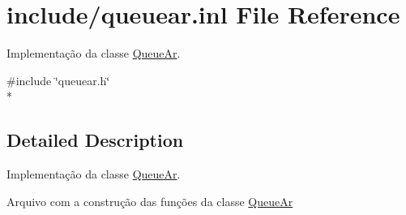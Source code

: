 \hypertarget{queuear_8inl}{}\section{include/queuear.inl File Reference}
\label{queuear_8inl}


Implementação da classe \hyperlink{class_queue_ar}{Queue\+Ar}.  


{\ttfamily \#include \char`\"{}queuear.\+h\char`\"{}}\\*


\subsection{Detailed Description}
Implementação da classe \hyperlink{class_queue_ar}{Queue\+Ar}. 

Arquivo com a construção das funções da classe \hyperlink{class_queue_ar}{Queue\+Ar} 